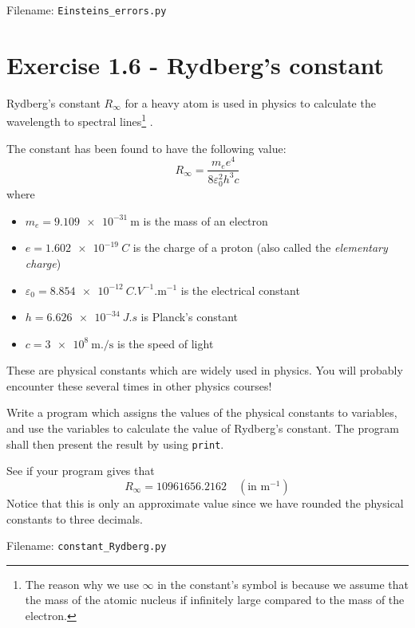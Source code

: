 \documentclass[10pt,a4paper]{article}
\begin{document}


Filename: \texttt{Einsteins\_errors.py}





\section*{Exercise 1.6 - Rydberg's constant}

Rydberg's constant $R_{\infty}$ for a heavy atom is used in physics to calculate the wavelength to spectral lines\footnote{The reason why we use $\infty$ in the constant's symbol is because we assume that the mass of the atomic nucleus if infinitely large compared to the mass of the electron. } . 

The constant has been found to have the following value:
\[
R_{\infty} = \frac{m_ee^4}{8 \varepsilon_0^2h^3c }
\]
where
\begin{itemize}
	\item $m_e = \SI{9.109e-31}{\meter}$  is the mass of an electron
	\item  $e = \SI{1.602e-19}{C}$  is the charge of a proton (also called the \textit{elementary charge})
	\item $\varepsilon_0 = \SI{8.854e-12}{C.V^{-1}.\meter^{-1}}$ is the electrical constant
	\item $h = \SI{6.626e-34}{J.s}$ is Planck's constant
	\item $c = \SI{3e8}{\meter.\per\second}$ is the speed of light
\end{itemize}
These are physical constants which are widely used in physics. You will probably encounter these several times in other physics courses!

Write a program which assigns the values of the physical constants to variables, and use the variables to calculate the value of Rydberg's constant. The program shall then present the result by using \texttt{print}. 

See if your program gives that
\[
R_{\infty} = 10961656.2162\quad (\text{in }\mathrm{m^{-1}})
\]
Notice that this is only an approximate value since we have rounded the physical constants to three decimals. 

Filename: \texttt{constant\_Rydberg.py}
\end{document}
